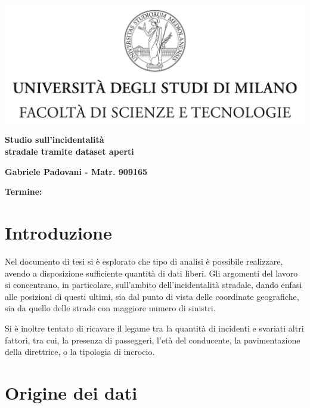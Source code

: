\documentclass[a4paper]{article}
\begin{document}
    \includegraphics[width=\textwidth]{../tesi/Logo.jpg}
    \vspace{3mm}
    \begin{center}
    {\huge{\bf Studio sull'incidentalità}}\\
    \vspace{3mm}
    {\huge{\bf stradale tramite dataset aperti}}\\
    \end{center}
    \vspace{3mm}
    \begin{center}
    {\bf Gabriele Padovani - Matr. 909165}\\
    \end{center}
    \vspace{2mm}
    \begin{center}
    {\bf Termine:}\\
    \end{center}

\section{Introduzione}

Nel documento di tesi si è esplorato che tipo di analisi è possibile realizzare, 
avendo a disposizione sufficiente quantità di dati liberi. 
Gli argomenti del lavoro si concentrano, in particolare, sull'ambito dell'incidentalità 
stradale, dando enfasi alle posizioni di questi ultimi, sia dal punto di vista delle coordinate 
geografiche, sia da quello delle strade con maggiore numero di sinistri. 

Si è inoltre tentato di ricavare il legame tra la quantità di incidenti e svariati altri 
fattori, tra cui, la presenza di passeggeri, l'età del conducente, 
la pavimentazione della direttrice, o la tipologia di incrocio.

\section{Origine dei dati}
\end{document}
